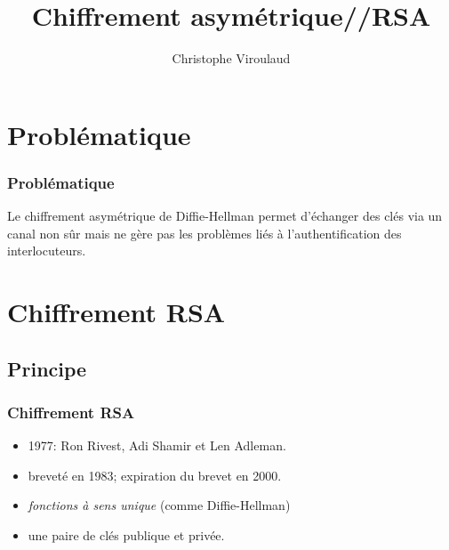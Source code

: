 \documentclass[svgnames,11pt]{beamer}
\author[]{Christophe Viroulaud}
\title{Chiffrement asymétrique//RSA}
\date{}
\institute{Terminale NSI}
\begin{document}
\begin{frame}
\titlepage
\end{frame}

\section{Problématique} 
\begin{frame}
    \frametitle{Problématique}

    Le chiffrement asymétrique de Diffie-Hellman permet d'échanger des clés via un canal non sûr mais ne gère pas les problèmes liés à l'authentification des interlocuteurs.
\begin{center}
\end{center}
\end{frame}

\section{Chiffrement RSA}
\subsection{Principe}
\begin{frame}
    \frametitle{Chiffrement RSA}
\begin{itemize}
    \item 1977: Ron Rivest, Adi Shamir et Len Adleman. 
    \item breveté en 1983; expiration du brevet en 2000.
    \item \emph{fonctions à sens unique} (comme Diffie-Hellman)
    \item une paire de clés publique et privée.

\end{itemize}  

\end{frame}
\end{document}
